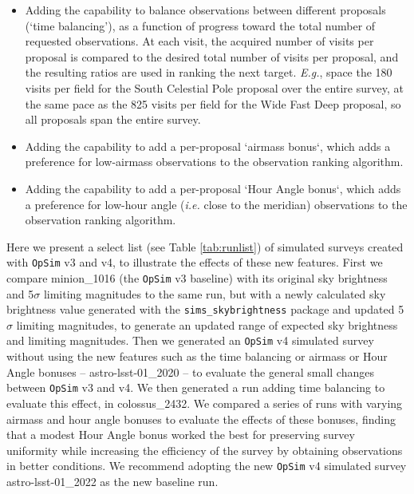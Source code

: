 \documentclass[DM,lsstdraft,authoryear,toc]{lsstdoc}
\newcommand{\opsim}{\texttt{OpSim}\xspace}
\newcommand{\simsky}{\texttt{sims\_skybrightness}\xspace}
\begin{document}
\begin{itemize}
\item Adding the capability to balance observations between different proposals (`time balancing'), as a function of progress toward the total number of requested observations. At each visit, the acquired number of visits per proposal is compared to the desired total number of visits per proposal, and the resulting ratios are used in ranking the next target.  {\it E.g.}, space the 180 visits per field for the South Celestial Pole proposal over the entire survey, at the same pace as the 825 visits per field for the Wide Fast Deep proposal, so all proposals span the entire survey.
\item Adding the capability to add a per-proposal `airmass bonus`, which adds a preference for low-airmass observations to the observation ranking algorithm.
\item Adding the capability to add a per-proposal `Hour Angle bonus`, which adds a preference for low-hour angle ({\it i.e.} close to the meridian) observations to the observation ranking algorithm.
\end{itemize}

Here we present a select list (see Table \ref{tab:runlist}) of simulated surveys created with \opsim v3 and v4, to illustrate the effects of these new features. First we compare minion\_1016 (the \opsim v3 baseline) with its original sky brightness and 5$\sigma$ limiting magnitudes to the same run, but with a newly calculated sky brightness value generated with the \simsky package and updated 5$\sigma$ limiting magnitudes, to generate an updated range of expected sky brightness and limiting magnitudes. Then we generated an \opsim v4 simulated survey without using the new features such as the time balancing or airmass or Hour Angle bonuses -- astro-lsst-01\_2020 -- to evaluate the general small changes between \opsim v3 and v4. We then generated a run adding time balancing to evaluate this effect, in colossus\_2432.  We compared a series of runs with varying airmass and hour angle bonuses to evaluate the effects of these bonuses, finding that a modest Hour Angle bonus worked the best for preserving survey uniformity while increasing the efficiency of the survey by obtaining observations in better conditions. We recommend adopting the new \opsim v4 simulated survey astro-lsst-01\_2022 as the new baseline run.
\end{document}
